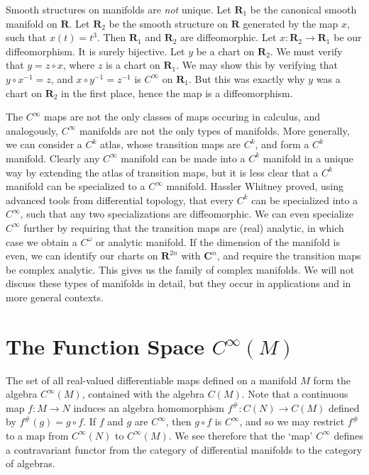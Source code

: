 \begin{example}
    Smooth structures on manifolds are {\it not} unique. Let $\mathbf{R}_1$ be the canonical smooth manifold on $\mathbf{R}$. Let $\mathbf{R}_2$ be the smooth structure on $\mathbf{R}$ generated by the map $x$, such that $x(t) = t^3$. Then $\mathbf{R}_1$ and $\mathbf{R}_2$ are diffeomorphic. Let $x:\mathbf{R}_2 \to \mathbf{R}_1$ be our diffeomorphism. It is surely bijective. Let $y$ be a chart on $\mathbf{R}_2$. We must verify that $y = z \circ x$, where $z$ is a chart on $\mathbf{R}_1$. We may show this by verifying that $y \circ x^{-1} = z$, and $x \circ y^{-1} = z^{-1}$ is $C^\infty$ on $\mathbf{R}_1$. But this was exactly why $y$ was a chart on $\mathbf{R}_2$ in the first place, hence the map is a diffeomorphism.
\end{example}

The $C^\infty$ maps are not the only classes of maps occuring in calculus, and analogously, $C^\infty$ manifolds are not the only types of manifolds. More generally, we can consider a $C^k$ atlas, whose transition maps are $C^k$, and form a $C^k$ manifold. Clearly any $C^\infty$ manifold can be made into a $C^k$ manifold in a unique way by extending the atlas of transition maps, but it is less clear that a $C^k$ manifold can be specialized to a $C^\infty$ manifold. Hassler Whitney proved, using advanced tools from differential topology, that every $C^k$ can be specialized into a $C^\infty$, such that any two specializations are diffeomorphic. We can even specialize $C^\infty$ further by requiring that the transition maps are (real) analytic, in which case we obtain a $C^\omega$ or analytic manifold. If the dimension of the manifold is even, we can identify our charts on $\mathbf{R}^{2n}$ with $\mathbf{C}^n$, and require the transition maps be complex analytic. This gives us the family of complex manifolds. We will not discuss these types of manifolds in detail, but they occur in applications and in more general contexts.

\section{The Function Space $C^\infty(M)$}

The set of all real-valued differentiable maps defined on a manifold $M$ form the algebra $C^\infty(M)$, contained with the algebra $C(M)$. Note that a continuous map $f: M \to N$ induces an algebra homomorphism $f^\#: C(N) \to C(M)$ defined by $f^\#(g) = g \circ f$. If $f$ and $g$ are $C^\infty$, then $g \circ f$ is $C^\infty$, and so we may restrict $f^\#$ to a map from $C^\infty(N)$ to $C^\infty(M)$. We see therefore that the `map' $C^\infty$ defines a contravariant functor from the category of differential manifolds to the category of algebras.

